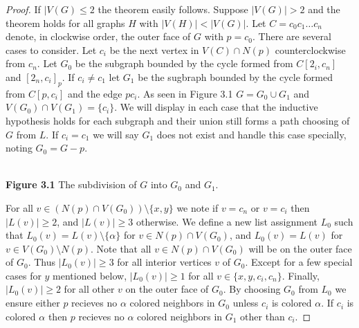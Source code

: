 \documentclass[11pt,letter]{article}
\begin{document}
\begin{proof}
If $|V(G)\le 2$ the theorem easily follows. Suppose $|V(G)|>2$ and the theorem
holds for all graphs $H$ with $|V(H)|<|V(G)|$. Let
$C=c_0c_1\ldots c_n$ denote, in clockwise order, the outer face of $G$ with $p=c_0$.
There are several cases to consider. Let $c_i$ be the next vertex in $V(C)\cap N(p)$ counterclockwise from $c_n$.
Let $G_0$ be the subgraph bounded by the cycle formed from $C[2_i,c_n]$ and $[2_n,c_i]_p$. If $c_i\ne c_1$ let
$G_1$ be the sugbraph bounded by the cycle formed from $C[p,c_i]$ and the edge $pc_i$. As seen in Figure
3.1 $G=G_0\cup G_1$ and $V(G_0)\cap V(G_1)=\{c_i\}$.
We will display in each case that the inductive hypothesis holds for each subgraph and their union still
forms a path choosing of $G$ from $L$.
If $c_i=c_1$ we will say $G_1$ does not exist and handle this case specially, noting $G_0=G-p$.

\begin{center}
\hfill\\
\textbf{Figure 3.1} The subdivision of $G$ into $G_0$ and $G_1$.
\end{center}

\noindent For all $v\in (N(p)\cap V(G_0))\setminus\{x,y\}$ we note if $v=c_n$ or $v=c_i$
then $|L(v)|\ge 2$, and $|L(v)|\ge3$ otherwise. We define a new list assignment $L_0$
such that $L_0(v)=L(v)\setminus\{\alpha\}$ for
$v\in N(p)\cap V(G_0)$, and $L_0(v)=L(v)$ for $v\in V(G_0)\setminus N(p)$. Note that all
$v\in N(p)\cap V(G_0)$ will be on the outer face of $G_0$. Thus $|L_0(v)|\ge 3$ for all interior
vertices $v$ of $G_0$. Except for a few special cases for $y$ mentioned below, $|L_0(v)|\ge 1$ for all
$v\in\{x,y,c_i,c_n\}$. Finally, $|L_0(v)|\ge2$ for all other $v$ on the outer face of $G_0$. By choosing $G_0$ from
$L_0$ we ensure either $p$ recieves no $\alpha$ colored neighbors in $G_0$ unless $c_i$ is colored $\alpha$.
If $c_i$ is colored $\alpha$ then $p$ recieves no $\alpha$ colored neighbors in $G_1$ other than $c_i$.


\end{proof}
\end{document}
